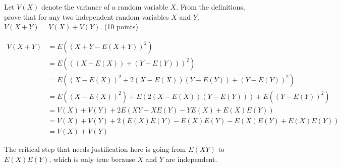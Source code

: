 \documentclass[fleqn]{homework}
\begin{document}
  \maketitle

  \begin{problem}{1}
    \begin{question}
      Let $V(X)$ denote the variance of a random variable $X$.  From the
      definitions, prove that for any two independent random variables $X$ and
      $Y$, $V(X + Y) = V(X) + V(Y)$. (10 points)
    \end{question}

    \begin{align*}
      V(X + Y) &= E((X+Y-E(X+Y))^2) \\
               &= E(((X-E(X)) + (Y-E(Y)))^2) \\
               &= E((X-E(X))^2 + 2(X-E(X))(Y-E(Y)) + (Y-E(Y))^2) \\
               &= E((X-E(X))^2) + E(2(X-E(X))(Y-E(Y))) + E((Y-E(Y))^2) \\
               &= V(X) + V(Y) + 2E(XY - XE(Y) - YE(X) + E(X)E(Y)) \\
               &= V(X) + V(Y) + 2(E(X)E(Y) - E(X)E(Y) - E(X)E(Y) + E(X)E(Y)) \\
               &= V(X) + V(Y)
    \end{align*}

    The critical step that needs justification here is going from $E(XY)$ to
    $E(X)E(Y)$, which is only true because $X$ and $Y$ are independent.
  \end{problem}
\end{document}
